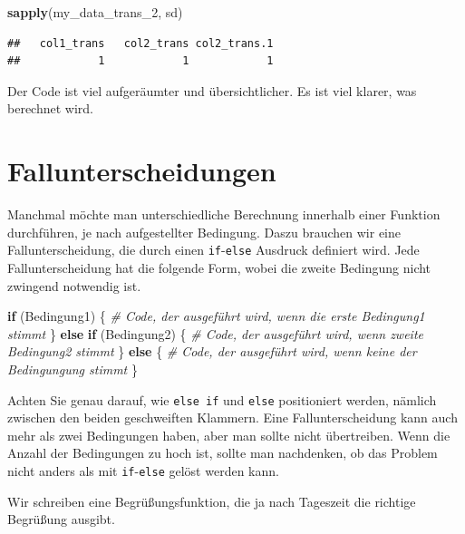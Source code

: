 \documentclass[]{book}
\newenvironment{Shaded}{\begin{snugshade}}{\end{snugshade}}
\newcommand{\CommentTok}[1]{\textcolor[rgb]{0.56,0.35,0.01}{\textit{#1}}}
\newcommand{\ControlFlowTok}[1]{\textcolor[rgb]{0.13,0.29,0.53}{\textbf{#1}}}
\newcommand{\DecValTok}[1]{\textcolor[rgb]{0.00,0.00,0.81}{#1}}
\newcommand{\KeywordTok}[1]{\textcolor[rgb]{0.13,0.29,0.53}{\textbf{#1}}}
\newcommand{\NormalTok}[1]{#1}
\begin{document}
\begin{Shaded}
\begin{Highlighting}[]
\KeywordTok{sapply}\NormalTok{(my_data_trans_}\DecValTok{2}\NormalTok{, sd)}
\end{Highlighting}
\end{Shaded}

\begin{verbatim}
##   col1_trans   col2_trans col2_trans.1 
##            1            1            1
\end{verbatim}

Der Code ist viel aufgeräumter und übersichtlicher. Es ist viel klarer, was berechnet wird.

\hypertarget{fallunterscheidungen}{%
\section{Fallunterscheidungen}\label{fallunterscheidungen}}

Manchmal möchte man unterschiedliche Berechnung innerhalb einer Funktion durchführen, je nach aufgestellter Bedingung. Daszu brauchen wir eine Fallunterscheidung, die durch einen \texttt{if}-\texttt{else} Ausdruck definiert wird. Jede Fallunterscheidung hat die folgende Form, wobei die zweite Bedingung nicht zwingend notwendig ist.

\begin{Shaded}
\begin{Highlighting}[]
\ControlFlowTok{if}\NormalTok{ (Bedingung1) \{}
  \CommentTok{# Code, der ausgeführt wird, wenn die erste Bedingung1 stimmt}
\NormalTok{\} }\ControlFlowTok{else} \ControlFlowTok{if}\NormalTok{ (Bedingung2) \{}
  \CommentTok{# Code, der ausgeführt wird, wenn zweite Bedingung2 stimmt}
\NormalTok{\} }\ControlFlowTok{else}\NormalTok{ \{}
  \CommentTok{# Code, der ausgeführt wird, wenn keine der Bedingungung stimmt}
\NormalTok{\}}
\end{Highlighting}
\end{Shaded}

Achten Sie genau darauf, wie \texttt{else\ if} und \texttt{else} positioniert werden, nämlich zwischen den beiden geschweiften Klammern. Eine Fallunterscheidung kann auch mehr als zwei Bedingungen haben, aber man sollte nicht übertreiben. Wenn die Anzahl der Bedingungen zu hoch ist, sollte man nachdenken, ob das Problem nicht anders als mit \texttt{if}-\texttt{else} gelöst werden kann.

Wir schreiben eine Begrüßungsfunktion, die ja nach Tageszeit die richtige Begrüßung ausgibt.
\end{document}

